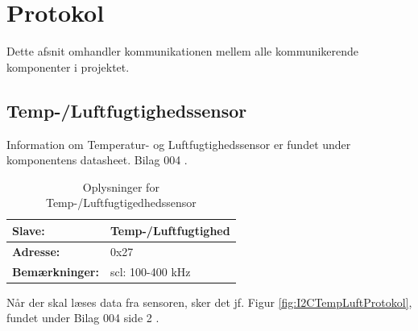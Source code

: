 \section{\IIC Protokol} \label{sec:I2C_protokol}
Dette afsnit omhandler kommunikationen mellem alle \IIC kommunikerende komponenter i projektet.

\subsection{Temp-/Luftfugtighedssensor} %
Information om Temperatur- og Luftfugtighedssensor er fundet under komponentens datasheet. Bilag 004 \cite{lib:TempHum_I2C}.

\begin{table}[h]
\centering
\begin{tabularx}{0.6\textwidth}{| X | X |} 			\hline
\textbf{Slave:} 		& Temp-/Luftfugtighed		\\ \hline
\textbf{Adresse:}		& 0x27						\\ \hline
\textbf{Bemærkninger:}	& scl: 100-400 kHz			\\ \hline
\end{tabularx}
\caption{\IIC Oplysninger for Temp-/Luftfugtigedhedssensor}
\label{tbl:I2CTempLuftOplysninger}
\end{table}


Når der skal læses data fra sensoren, sker det jf. Figur \ref{fig:I2CTempLuftProtokol}, fundet under Bilag 004 side 2 \cite{lib:TempHum_I2C}.


